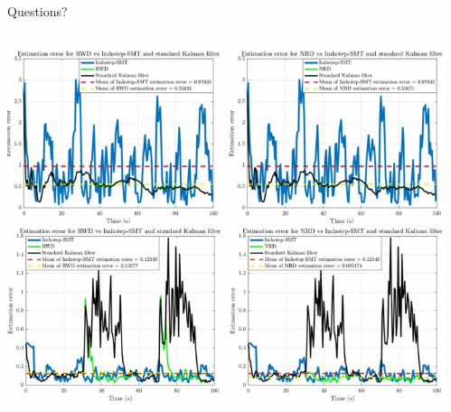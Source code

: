\documentclass[aspectratio=169]{beamer}
\begin{document}
\begin{frame}{Questions?}
\begin{columns}
\begin{column}{0.35\textwidth}
			\includegraphics[width=\columnwidth]{Images/Sim_Error_Comparrision_Stealthy}
			\includegraphics[width=\columnwidth]{Images/Sim_Error_Comparison_VeryUnstealthy}
		\end{column}
		\begin{column}{0.25\textwidth}

\end{column}
\end{columns}
\end{frame}
\end{document}
